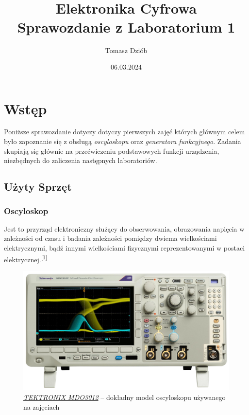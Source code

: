 \documentclass{article}
\begin{document}
  \pagestyle{fancy} %
  \fancyhf{} %
  \fancyfoot[C]{\thepage}
  \renewcommand{\headrulewidth}{0pt} %
  \renewcommand{\footrulewidth}{0.4pt} %
  \addtolength{\footskip}{0cm} %

  \title{Elektronika Cyfrowa \\ {\large Sprawozdanie z Laboratorium 1}}
  \date{06.03.2024}
  \author{Tomasz Dziób}
  \maketitle

  \tableofcontents
  \pagebreak
  
  \section{Wstęp}
    Poniższe sprawozdanie dotyczy dotyczy pierwszych zajęć których głównym celem było zapoznanie się z obsługą \textit{oscyloskopu} oraz \textit{generatora funkcyjnego}. Zadania skupiają się głównie na przećwiczeniu podstawowych funkcji urządzenia, niezbędnych do zaliczenia następnych laboratoriów.
    \subsection{Użyty Sprzęt}
      \subsubsection{Oscyloskop} 
        Jest to przyrząd elektroniczny służący do obserwowania, obrazowania napięcia w zależności od czasu i badania zależności pomiędzy dwiema wielkościami elektrycznymi, bądź innymi wielkościami fizycznymi reprezentowanymi w postaci elektrycznej.\textsuperscript{[1]}
        \begin{figure}[!ht]
          \begin{center}
              \includegraphics[scale=0.147]{grafiki/2381337-40.jpg}
              \caption{\textit{\href{https://pl.farnell.com/tektronix/mdo3012/oscilloscope-2ch-100mhz-2-5gsps/dp/2381346}{TEKTRONIX MDO3012}} -- dokładny model oscyloskopu używanego  na zajęciach}
          \end{center}
        \end{figure}
\end{document}
